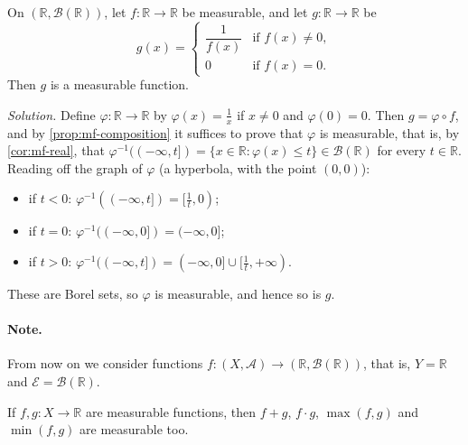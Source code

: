 \begin{example}\label{exa:mf-reciprocal}
On $(\mathbb R,\mathcal B(\mathbb R))$, let $f:\mathbb R\to\mathbb R$ be measurable, and let
$g:\mathbb R\to\mathbb R$ be
\[
  g(x)=\begin{cases}\dfrac1{f(x)} & \text{if } f(x)\ne0,\\[4pt] 0 & \text{if } f(x)=0.\end{cases}
\]
Then $g$ is a measurable function.

\emph{Solution.} Define $\varphi:\mathbb R\to\mathbb R$ by $\varphi(x)=\frac1x$ if $x\ne0$ and
$\varphi(0)=0$. Then $g=\varphi\circ f$, and by \cref{prop:mf-composition} it suffices to prove
that $\varphi$ is measurable, that is, by \cref{cor:mf-real}, that
$\varphi^{-1}((-\infty,t])=\{x\in\mathbb R:\varphi(x)\le t\}\in\mathcal B(\mathbb R)$ for every
$t\in\mathbb R$. Reading off the graph of $\varphi$ (a hyperbola, with the point $(0,0)$):
\begin{itemize}
  \item if $t<0$: $\varphi^{-1}((-\infty,t])=[\frac1t,0)$;
  \item if $t=0$: $\varphi^{-1}((-\infty,0])=(-\infty,0]$;
  \item if $t>0$: $\varphi^{-1}((-\infty,t])=(-\infty,0]\cup[\frac1t,+\infty)$.
\end{itemize}
These are Borel sets, so $\varphi$ is measurable, and hence so is $g$.
\end{example}

\paragraph{Note.} From now on we consider functions $f:(X,\mathcal A)\to(\mathbb R,\mathcal
B(\mathbb R))$, that is, $Y=\mathbb R$ and $\mathcal E=\mathcal B(\mathbb R)$.

\begin{proposition}[Operations]\label{prop:mf-operations}
If $f,g:X\to\mathbb R$ are measurable functions, then $f+g$, $f\cdot g$, $\max(f,g)$ and
$\min(f,g)$ are measurable too.
\end{proposition}

